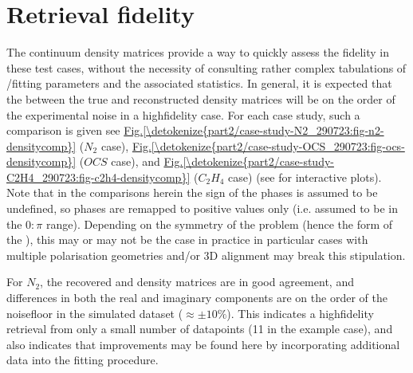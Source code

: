 \documentclass[letterpaper,table,10pt,english]{jupyterBook}
\begin{document}
\section{Retrieval fidelity}
\label{\detokenize{part2/case-study-summaries_240723:retrieval-fidelity}}
\sphinxAtStartPar
The continuum density matrices provide a way to quickly assess the {\hyperref[\detokenize{backmatter/glossary:term-bootstrap-retrieval-protocol}]{}} fidelity in these test cases, without the necessity of consulting rather complex tabulations of {\hyperref[\detokenize{backmatter/glossary:term-radial-matrix-elements}]{}}/fitting parameters and the associated statistics. In general, it is expected that the  between the true and reconstructed density matrices will be on the order of the experimental noise in a high\sphinxhyphen{}fidelity case. For each case study, such a comparison is given \sphinxhyphen{} see \hyperref[\detokenize{part2/case-study-N2_290723:fig-n2-densitycomp}]{Fig.\@ \ref{\detokenize{part2/case-study-N2_290723:fig-n2-densitycomp}}} (\(N_2\) case), \hyperref[\detokenize{part2/case-study-OCS_290723:fig-ocs-densitycomp}]{Fig.\@ \ref{\detokenize{part2/case-study-OCS_290723:fig-ocs-densitycomp}}} (\(OCS\) case), and \hyperref[\detokenize{part2/case-study-C2H4_290723:fig-c2h4-densitycomp}]{Fig.\@ \ref{\detokenize{part2/case-study-C2H4_290723:fig-c2h4-densitycomp}}} (\(C_2H_4\) case) (see  for interactive plots). Note that in the comparisons herein the sign of the phases is assumed to be undefined, so phases are remapped to positive values only (i.e. assumed to be in the \(0:\pi\) range). Depending on the symmetry of the problem (hence the form of the {\hyperref[\detokenize{backmatter/glossary:term-channel-functions}]{}}), this may or may not be the case in practice \sphinxhyphen{} in particular cases with multiple polarisation geometries and/or 3D alignment may break this stipulation.

\sphinxAtStartPar
For \(N_2\), the recovered and density matrices are in good agreement, and differences in both the real and imaginary components are on the order of the noise\sphinxhyphen{}floor in the simulated dataset (\(\approx\pm10\%\)). This indicates a high\sphinxhyphen{}fidelity retrieval from only a small number of data\sphinxhyphen{}points (11 in the example case), and also indicates that improvements may be found here by incorporating additional data into the fitting procedure.
\end{document}
